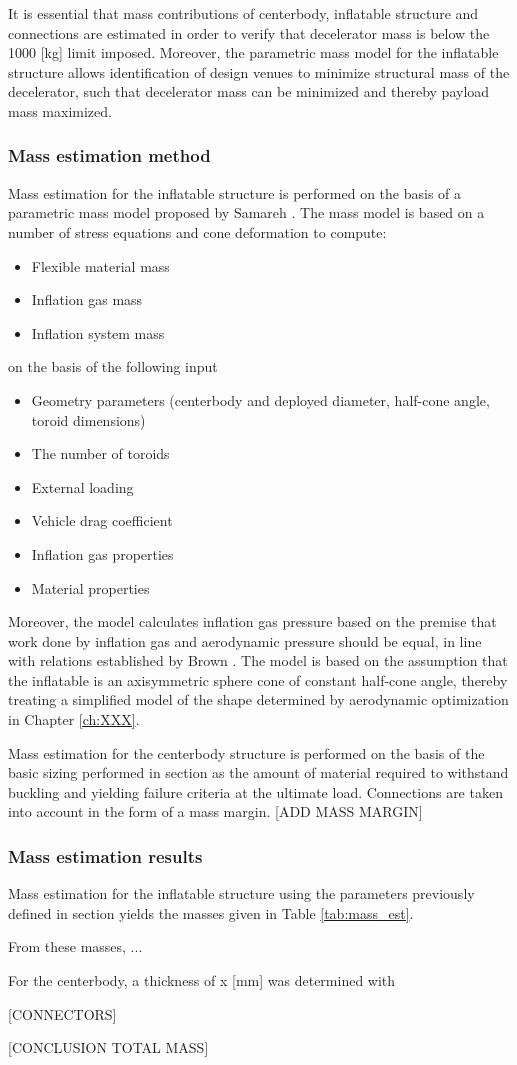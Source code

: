 It is essential that mass contributions of centerbody, inflatable structure and connections are estimated in order to verify that decelerator mass is below the 1000 [kg] limit imposed. Moreover, the parametric mass model for the inflatable structure allows identification of design venues to minimize structural mass of the decelerator, such that decelerator mass can be minimized and thereby payload mass maximized. 

\subsubsection{Mass estimation method}
Mass estimation for the inflatable structure is performed on the basis of a parametric mass model proposed by Samareh \cite{Samareh2011}. The mass model is based on a number of stress equations and cone deformation to compute:
\begin{itemize}
\item Flexible material mass
\item Inflation gas mass
\item Inflation system mass
\end{itemize}
on the basis of the following input
\begin{itemize}
\item Geometry parameters (centerbody and deployed diameter, half-cone angle, toroid dimensions)
\item The number of toroids
\item External loading
\item Vehicle drag coefficient
\item Inflation gas properties
\item Material properties
\end{itemize}
Moreover, the model calculates inflation gas pressure based on the premise that work done by inflation gas and aerodynamic pressure should be equal, in line with relations established by Brown \cite{Brown2009}. The model is based on the assumption that the inflatable is an axisymmetric sphere cone of constant half-cone angle, thereby treating a simplified model of the shape determined by aerodynamic optimization in Chapter \ref{ch:XXX}. 

Mass estimation for the centerbody structure is performed on the basis of the basic sizing performed in section \label{sec:struc_Centerbody} as the amount of material required to withstand buckling and yielding failure criteria at the ultimate load. Connections are taken into account in the form of a mass margin. [ADD MASS MARGIN] 

\subsubsection{Mass estimation results}
Mass estimation for the inflatable structure using the parameters previously defined in section \label{sec:struc_InflatableLoad} yields the masses given in Table \ref{tab:mass_est}. 

From these masses, ...

For the centerbody, a thickness of x [mm] was determined with

[CONNECTORS]

[CONCLUSION TOTAL MASS]

